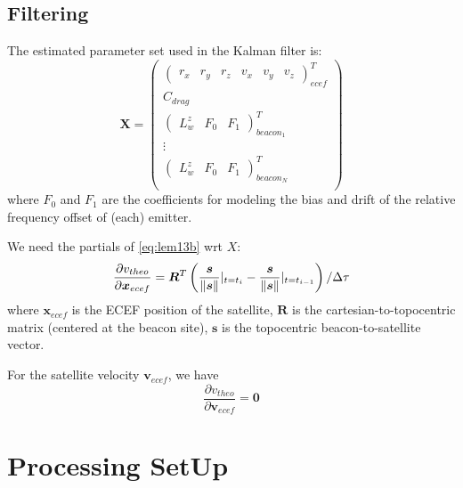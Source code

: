 \subsection{Filtering}
\label{ssec:filtering}
The estimated parameter set used in the Kalman filter is:
\begin{equation}
  \bm{X} = \begin{pmatrix}
    \begin{pmatrix} r_x & r_y & r_z & v_x & v_y & v_z \end{pmatrix}^T_{ecef} \\
    C_{drag} \\
    \begin{pmatrix} L^z_w & F_0 & F_1 \end{pmatrix}^T_{beacon_1} \\
    \vdots \\
    \begin{pmatrix} L^z_w & F_0 & F_1 \end{pmatrix}^T_{beacon_N} \\
  \end{pmatrix}
\end{equation}
where $F_0$ and $F_1$ are the coefficients for modeling the bias and drift of the 
relative frequency offset of (each) emitter.

We need the partials of \ref{eq:lem13b} wrt $X$:
\begin{equation}
  \frac{\partial v_{theo}}{\partial \bm{x}_{ecef}} = \bm{R}^T \left( \frac{\bm{s}}{\lVert\bm{s}\rVert}|_{t=t_i} - \frac{\bm{s}}{\lVert\bm{s}\rVert}|_{t=t_{i-1}} \right) / \Delta \tau
  \label{eq:partials-pos}
\end{equation}
where $\bm{x}_{ecef}$ is the ECEF position of the satellite, $\bm{R}$ is the 
cartesian-to-topocentric matrix (centered at the beacon site), $\bm{s}$ is the 
topocentric beacon-to-satellite vector.

For the satellite velocity $\bm{v}_{ecef}$, we have
\begin{equation}
  \frac{\partial v_{theo}}{\partial \bm{v}_{ecef}} = \bm{0}
  \label{eq:partials-vel}
\end{equation}

\section{Processing SetUp}

